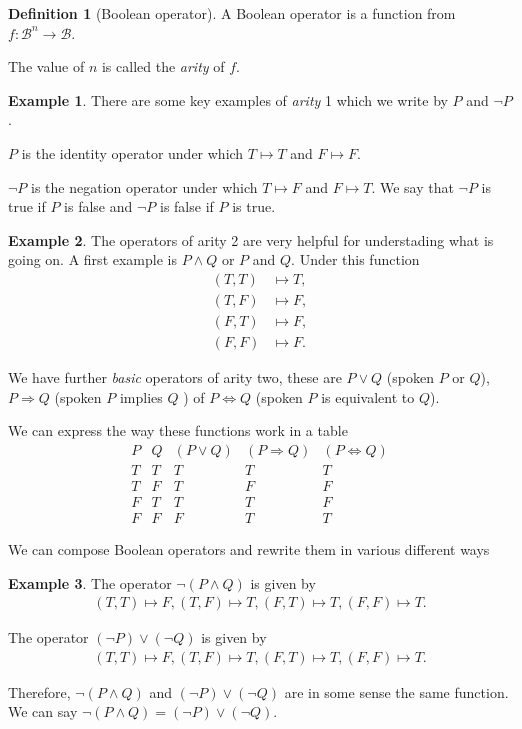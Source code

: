 \documentclass[
]{book}
\theoremstyle{definition}
\newtheorem{definition}{Definition}[chapter]
\theoremstyle{definition}
\newtheorem{example}{Example}[chapter]
\theoremstyle{definition}
\theoremstyle{definition}
\theoremstyle{remark}
\begin{document}
\begin{definition}[Boolean operator]
A Boolean operator is a function from \(f: \mathcal{B}^n \rightarrow \mathcal{B}\).

The value of \(n\) is called the \emph{arity} of \(f\).
\end{definition}

\begin{example}
There are some key examples of \emph{arity} 1 which we write by \(P\) and \(\neg P\).

\(P\) is the identity operator under which \(T \mapsto T\) and \(F \mapsto F\).

\(\neg P\) is the negation operator under which \(T \mapsto F\) and \(F \mapsto T\). We say that \(\neg P\) is true if \(P\) is false and \(\neg P\) is false if \(P\) is true.
\end{example}

\begin{example}
The operators of arity 2 are very helpful for understading what is going on. A first example is \(P \wedge Q\) or \(P\) and \(Q\). Under this function
\begin{align*}
(T,T) & \mapsto T, \\
(T,F) & \mapsto F, \\
(F,T) & \mapsto F, \\
(F,F) & \mapsto F.
\end{align*}

We have further \emph{basic} operators of arity two, these are \(P \vee Q\) (spoken \(P\) or \(Q\)), \(P \Rightarrow Q\) (spoken \(P\) implies \(Q\) ) of \(P \Leftrightarrow Q\) (spoken \(P\) is equivalent to \(Q\)).

We can express the way these functions work in a table
\begin{equation}
\begin{array}{cc|ccc}
P & Q & (P \vee Q) & (P \Rightarrow Q) & (P \Leftrightarrow Q)\\
\hline
T & T & T & T & T \\
T & F & T & F & F \\
F & T & T & T & F \\
F & F & F & T & T
\end{array}
\end{equation}
\end{example}

We can compose Boolean operators and rewrite them in various different ways

\begin{example}
The operator \(\neg (P \wedge Q)\) is given by
\begin{align*}
(T,T) \mapsto F,
(T,F) \mapsto T,
(F,T) \mapsto T,
(F,F) \mapsto T.
\end{align*}

The operator \((\neg P) \vee (\neg Q)\) is given by
\begin{align*}
(T,T) \mapsto F,
(T,F) \mapsto T,
(F,T) \mapsto T,
(F,F) \mapsto T.
\end{align*}

Therefore, \(\neg(P \wedge Q)\) and \((\neg P) \vee (\neg Q)\) are in some sense the same function. We can say \(\neg(P \wedge Q)=(\neg P) \vee (\neg Q)\).
\end{example}
\end{document}
